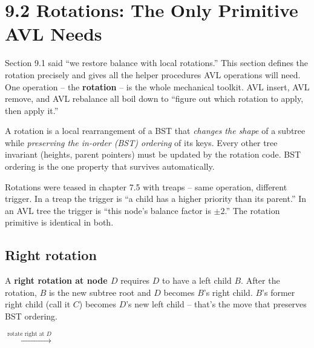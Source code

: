 \documentclass[11pt]{article}
\begin{document}
\section{9.2 Rotations: The Only Primitive AVL Needs}

Section 9.1 said ``we restore balance with local rotations.'' This section defines the rotation precisely and gives all the helper procedures AVL operations will need. One operation -- the \textbf{rotation} -- is the whole mechanical toolkit. AVL insert, AVL remove, and AVL rebalance all boil down to ``figure out which rotation to apply, then apply it.''

\begin{defnbox}[Rotation]
A rotation is a local rearrangement of a BST that \emph{changes the shape} of a subtree while \emph{preserving the in-order (BST) ordering} of its keys. Every other tree invariant (heights, parent pointers) must be updated by the rotation code. BST ordering is the one property that survives automatically.
\end{defnbox}

Rotations were teased in chapter 7.5 with treaps -- same operation, different trigger. In a treap the trigger is ``a child has a higher priority than its parent.'' In an AVL tree the trigger is ``this node's balance factor is $\pm 2$.'' The rotation primitive is identical in both.

\subsection*{Right rotation}

A \textbf{right rotation at node $D$} requires $D$ to have a left child $B$. After the rotation, $B$ is the new subtree root and $D$ becomes $B$'s right child. $B$'s former right child (call it $C$) becomes $D$'s new left child -- that's the move that preserves BST ordering.

\begin{center}
\quad $\xrightarrow{\text{rotate right at } D}$ \quad
{}
\end{center}
\end{document}
